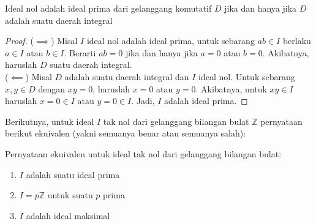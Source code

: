 	\begin{theorem}
	Ideal nol adalah ideal prima dari gelanggang komutatif $D$ jika dan hanya jika $D$ adalah suatu daerah integral
	\end{theorem} 
	\begin{proof}
		($\implies$) Misal $I$ ideal nol adalah ideal prima, untuk sebarang $ab \in I$ berlaku $a \in I$ atau $b \in I$. Berarti $ab = 0$ jika dan hanya jika $a = 0$ atau $b = 0$. Akibatnya, haruslah $D$ suatu daerah integral.
		\\
		
		($\impliedby$) Misal $D$ adalah suatu daerah integral dan $I$ ideal nol. Untuk sebarang $x,y \in D$ dengan $xy = 0$, haruslah $x = 0$ atau $y = 0$. Akibatnya, untuk $xy \in I$ haruslah $x = 0 \in I$ atau $y = 0 \in I$. Jadi, $I$ adalah ideal prima.
	\end{proof}
	Berikutnya, untuk ideal $I$ tak nol dari gelanggang bilangan bulat $\mathbb{Z}$ pernyataan berikut ekuivalen (yakni semuanya benar atau semuanya salah):
	\begin{theorem}
		Pernyataan ekuivalen untuk ideal tak nol dari gelanggang bilangan bulat:
		\begin{enumerate}
			\item $I$ adalah suatu ideal prima
			\item $I = p\mathbb{Z}$ untuk suatu $p$ prima
			\item $I$ adalah ideal maksimal
		\end{enumerate}
	\end{theorem}
